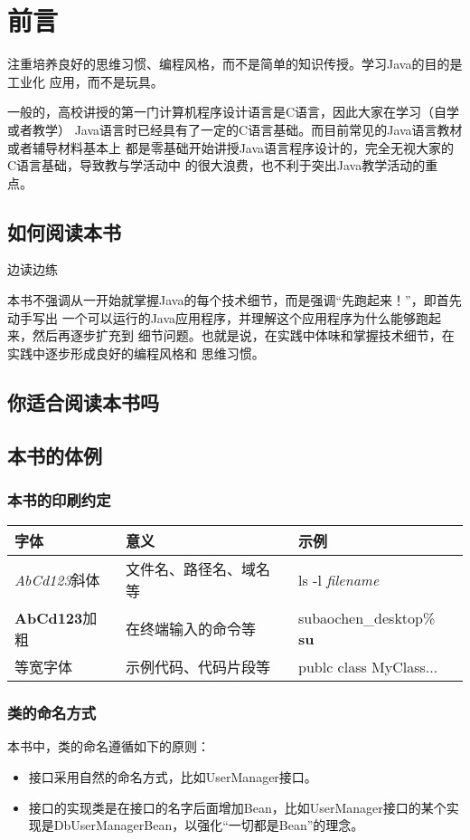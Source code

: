 \frontmatter
\chapter{前言}
注重培养良好的思维习惯、编程风格，而不是简单的知识传授。学习Java的目的是工业化
应用，而不是玩具。

一般的，高校讲授的第一门计算机程序设计语言是C语言，因此大家在学习（自学或者教学）
Java语言时已经具有了一定的C语言基础。而目前常见的Java语言教材或者辅导材料基本上
都是零基础开始讲授Java语言程序设计的，完全无视大家的C语言基础，导致教与学活动中
的很大浪费，也不利于突出Java教学活动的重点。

\section*{如何阅读本书}
边读边练

本书不强调从一开始就掌握Java的每个技术细节，而是强调“先跑起来！”，即首先动手写出
一个可以运行的Java应用程序，并理解这个应用程序为什么能够跑起来，然后再逐步扩充到
细节问题。也就是说，在实践中体味和掌握技术细节，在实践中逐步形成良好的编程风格和
思维习惯。

\section*{你适合阅读本书吗}
\section*{本书的体例}
\subsection*{本书的印刷约定}
\begin{tabular}{|l|l|l|}
    \hline
    字体 & 意义 & 示例 \\
    \hline
    \textsl{AbCd123}斜体 & 文件名、路径名、域名等 & ls -l \textsl{filename}\\
    \hline
    \textbf{AbCd123}加粗 & 在终端输入的命令等 & subaochen\_desktop\% \textbf{su} \\
    \hline
    等宽字体 & 示例代码、代码片段等 & publc class MyClass... \\
    \hline

\end{tabular}

\subsection*{类的命名方式}
本书中，类的命名遵循如下的原则：
\begin{itemize}
    \item 接口采用自然的命名方式，比如UserManager接口。
    \item 接口的实现类是在接口的名字后面增加Bean，比如UserManager接口的某个实现是DbUserManagerBean，以强化“一切都是Bean”的理念。
\end{itemize}
